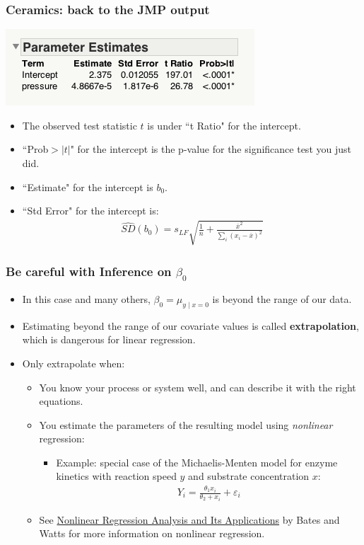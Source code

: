\documentclass[handout]{beamer}\usepackage[]{graphicx}\usepackage[]{color}
\providecommand{\e}{\varepsilon}
\providecommand{\ov}[1]{\overline{#1}}
\providecommand{\wh}[1]{\widehat{#1}}
\numberwithin{equation}{section}
\begin{document}
\begin{frame}
\frametitle{Ceramics: back to the JMP output}
\begin{center}
 \includegraphics{../../fig/jmpcerparams.png}
\end{center}
\begin{itemize}
\item The observed test statistic $t$ is under ``t Ratio" for the intercept.
\pause \item ``Prob$>|t|$" for the intercept is the p-value for the significance test you just did.
\pause \item ``Estimate" for the intercept is $b_0$.
\pause \item ``Std Error" for the intercept is:
\pause \begin{align*}
\wh{SD}(b_0) = s_{LF} \sqrt{    \frac{1}{n} +  \frac{ \ov{x}^2}{\sum_i(x_i - \ov{x})^2}} 
\end{align*}
\end{itemize}
\end{frame}

\begin{frame}
\frametitle{Be careful with Inference on $\beta_0$}
\begin{itemize}
\item In this case and many others, $\beta_0 = \mu_{y \mid x=0}$ is beyond the range of our data.
\pause \item Estimating beyond the range of our covariate values is called {\bf extrapolation}, which is dangerous for linear regression.
\pause \item Only extrapolate when:
\begin{itemize}
\pause \item You know your process or system well, and can describe it with the right equations.
\pause \item You estimate the parameters of the resulting model using \emph{nonlinear} regression:
\begin{itemize}
\pause \item Example: special case of the Michaelis-Menten model for enzyme kinetics with reaction speed $y$ and substrate concentration $x$:
\pause \begin{align*}
Y_i = \frac{\theta_1 x_i}{ \theta_2 + x_i} + \e_i
\end{align*}
\end{itemize}
\pause \item See \underline{Nonlinear Regression Analysis and Its Applications} by Bates and Watts for more information on nonlinear regression.
\end{itemize}
\end{itemize}
\end{frame}
\end{document}
